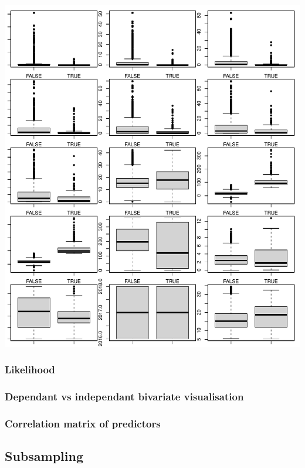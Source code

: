 \documentclass[12pt]{article}
\begin{document}
\includegraphics{MATH2269_final_project_files/figure-latex/unnamed-chunk-17-1.pdf}

\hypertarget{likelihood}{%
\subsubsection{Likelihood}\label{likelihood}}

\hypertarget{dependant-vs-independant-bivariate-visualisation}{%
\subsubsection{Dependant vs independant bivariate
visualisation}\label{dependant-vs-independant-bivariate-visualisation}}

\hypertarget{correlation-matrix-of-predictors}{%
\subsubsection{Correlation matrix of
predictors}\label{correlation-matrix-of-predictors}}

\hypertarget{subsampling}{%
\subsection{Subsampling}\label{subsampling}}
\end{document}
